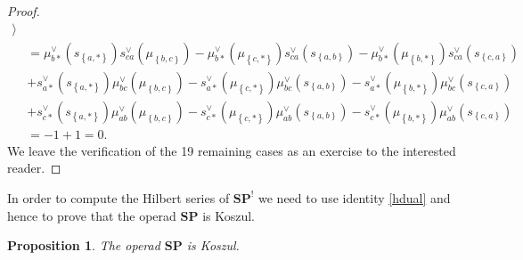 \documentclass[11pt]{article}
\newtheorem{prop}[theo]{Proposition}
\theoremstyle{definition}
\numberwithin{equation}{section}
\newcommand{\set}[1]{\left\{#1\right\}}
\newcommand{\op}[1]{\mathbf{#1}}
\newcommand{\SP}{\op{SP}}
\begin{document}
\begin{proof}
\begin{align}
        \Big\rangle  \\ \nonumber
        &= \mu_{b\ast}^{\vee}(s_{\set{a,\ast}})s_{ca}^{\vee}(\mu_{\set{b,c}}) 
        -\mu_{b\ast}^{\vee}(\mu_{\set{c,\ast}})s_{ca}^{\vee}(s_{\set{a,b}}) 
        -\mu_{b\ast}^{\vee}(\mu_{\set{b,\ast}})s_{ca}^{\vee}(s_{\set{c,a}}) \\ \nonumber
        &+ s_{a\ast}^{\vee}(s_{\set{a,\ast}})\mu_{bc}^{\vee}(\mu_{\set{b,c}}) 
        - s_{a\ast}^{\vee}(\mu_{\set{c,\ast}})\mu_{bc}^{\vee}(s_{\set{a,b}}) 
        - s_{a\ast}^{\vee}(\mu_{\set{b,\ast}})\mu_{bc}^{\vee}(s_{\set{c,a}}) \\ \nonumber
        &+ s_{c\ast}^{\vee}(s_{\set{a,\ast}})\mu_{ab}^{\vee}(\mu_{\set{b,c}}) 
        - s_{c\ast}^{\vee}(\mu_{\set{c,\ast}})\mu_{ab}^{\vee}(s_{\set{a,b}}) 
        - s_{c\ast}^{\vee}(\mu_{\set{b,\ast}})\mu_{ab}^{\vee}(s_{\set{c,a}}) \\ \nonumber
        &= -1 +1 = 0.
    \end{align}
    We leave the verification of the 19 remaining cases as an exercise to the interested reader.
\end{proof}

In order to compute the Hilbert series of $\SP^!$ we need to use identity \eqref{hdual} and hence to prove 
that the operad $\SP$ is Koszul.

\begin{prop}\label{sp_koszul}
    The operad $\SP$ is Koszul.
\end{prop}
\end{document}
